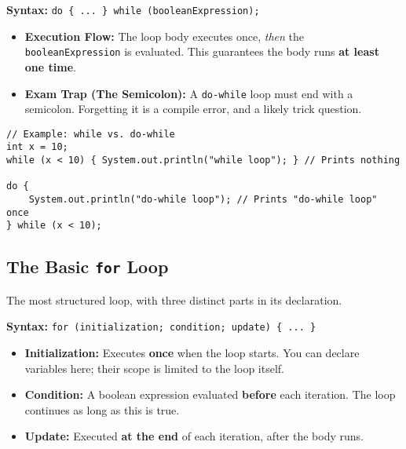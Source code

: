 \documentclass[12pt]{article}
\begin{document}
\begin{enumerate}[label=(\arabic*)]
\textbf{Syntax:} \texttt{do \{ ... \} while (booleanExpression);}
\begin{itemize}
    \item \textbf{Execution Flow:} The loop body executes once, \textit{then} the \texttt{booleanExpression} is evaluated. This guarantees the body runs \textbf{at least one time}.
    \item \textbf{Exam Trap (The Semicolon):} A \texttt{do-while} loop must end with a semicolon. Forgetting it is a compile error, and a likely trick question.
\end{itemize}

\begin{verbatim}
// Example: while vs. do-while
int x = 10;
while (x < 10) { System.out.println("while loop"); } // Prints nothing

do {
    System.out.println("do-while loop"); // Prints "do-while loop" once
} while (x < 10);
\end{verbatim}

\subsection*{The Basic \texttt{for} Loop}
The most structured loop, with three distinct parts in its declaration.

\textbf{Syntax:} \texttt{for (initialization; condition; update) \{ ... \}}
\begin{itemize}
    \item \textbf{Initialization:} Executes \textbf{once} when the loop starts. You can declare variables here; their scope is limited to the loop itself.
    \item \textbf{Condition:} A boolean expression evaluated \textbf{before} each iteration. The loop continues as long as this is true.
    \item \textbf{Update:} Executed \textbf{at the end} of each iteration, after the body runs.
\end{itemize}


\end{enumerate}
\end{document}
